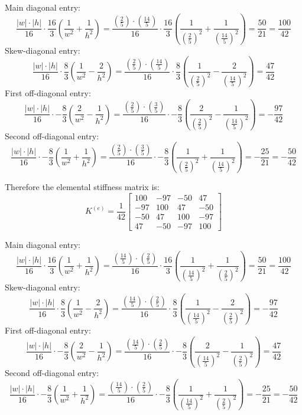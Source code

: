 \documentclass[12pt]{article}
\begin{document}

Main diagonal entry:
\[\frac{ |w| \cdot |h|}{16} \cdot \frac{16}{3} \left(\frac{1}{w^2} + \frac{1}{h^2}\right) = \frac{(\frac{2}{5}) \cdot (\frac{14}{5})}{16} \cdot \frac{16}{3} \left(\frac{1}{(\frac{2}{5})^2} + \frac{1}{(\frac{14}{5})^2}\right)= \frac{50}{21}=\frac{100}{42}\]
Skew-diagonal entry:
\[\frac{|w|\cdot |h|}{16} \cdot \frac{8}{3} \left(\frac{1}{w^2} - \frac{2}{h^2}\right) = \frac{(\frac{2}{5}) \cdot (\frac{14}{5})}{16} \cdot \frac{8}{3} \left(\frac{1}{(\frac{2}{5})^2} - \frac{2}{(\frac{14}{5})^2}\right)= \frac{47}{42}\]
First off-diagonal entry:
\[\frac{|w|\cdot |h|}{16} \cdot -\frac{8}{3} \left(\frac{2}{w^2} - \frac{1}{h^2}\right) = \frac{(\frac{2}{5}) \cdot (\frac{3}{5})}{16} \cdot -\frac{8}{3} \left(\frac{2}{(\frac{2}{5})^2} - \frac{1}{(\frac{14}{5})^2}\right)= -\frac{97}{42}\]
Second off-diagonal entry:
\[\frac{|w|\cdot |h|}{16} \cdot -\frac{8}{3} \left(\frac{1}{w^2} + \frac{1}{h^2}\right) = \frac{(\frac{2}{5}) \cdot (\frac{3}{5})}{16} \cdot -\frac{8}{3} \left(\frac{1}{(\frac{2}{5})^2} + \frac{1}{(\frac{14}{5})^2}\right)= -\frac{25}{21}=-\frac{50}{42}\]

Therefore the elemental stiffness matrix is:
\[K^{(e)} = \frac{1}{42}
\begin{bmatrix}
100 & -97 & -50 & 47 \\
-97 & 100 & 47 & -50 \\
-50 & 47 & 100 & -97 \\
47 & -50 & -97 & 100
\end{bmatrix}\]


Main diagonal entry:
\[\frac{ |w| \cdot |h|}{16} \cdot \frac{16}{3} \left(\frac{1}{w^2} + \frac{1}{h^2}\right) = \frac{(\frac{14}{5}) \cdot (\frac{2}{5})}{16} \cdot \frac{16}{3} \left(\frac{1}{(\frac{14}{5})^2} + \frac{1}{(\frac{2}{5})^2}\right)= \frac{50}{21}=\frac{100}{42}\]
Skew-diagonal entry:
\[\frac{|w|\cdot |h|}{16} \cdot \frac{8}{3} \left(\frac{1}{w^2} - \frac{2}{h^2}\right) = \frac{(\frac{14}{5}) \cdot (\frac{2}{5})}{16} \cdot \frac{8}{3} \left(\frac{1}{(\frac{14}{5})^2} - \frac{2}{(\frac{2}{5})^2}\right)= -\frac{97}{42}\]
First off-diagonal entry:
\[\frac{|w|\cdot |h|}{16} \cdot -\frac{8}{3} \left(\frac{2}{w^2} - \frac{1}{h^2}\right) = \frac{(\frac{14}{5}) \cdot (\frac{2}{5})}{16} \cdot -\frac{8}{3} \left(\frac{2}{(\frac{14}{5})^2} - \frac{1}{(\frac{2}{5})^2}\right) = \frac{47}{42}\]
Second off-diagonal entry:
\[\frac{|w|\cdot |h|}{16} \cdot -\frac{8}{3} \left(\frac{1}{w^2} + \frac{1}{h^2}\right) = \frac{(\frac{14}{5}) \cdot (\frac{2}{5})}{16} \cdot -\frac{8}{3} \left(\frac{1}{(\frac{14}{5})^2} + \frac{1}{(\frac{2}{5})^2}\right)= -\frac{25}{21}=-\frac{50}{42}\]
\end{document}
